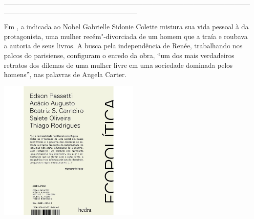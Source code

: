 \hspace*{-2cm}\_\_\_\_\_\_\_\_\_\_\_\_\_\_\_\_\_\_\_\_\_\_\_\_\_\_\_\_\_\_\_\_\_\_\_\_\_\_\_\_\_\_\_\_\_\_\_\_\_\_\_\_\_\_\_\_\_\_\_\_\_\_\_\_\_\_\_\_\_\_\_\_\_\_

\medskip

\noindent{}Em {}, a indicada ao Nobel Gabrielle Sidonie Colette mistura sua vida pessoal à da protagonista, uma mulher recém"-divorciada de um homem que a traía e roubava a autoria de seus livros. A busca pela independência de Renée, trabalhando nos palcos do {} parisiense, configuram o enredo da obra, “um dos mais verdadeiros retratos dos dilemas de uma mulher livre em uma sociedade dominada pelos homens”, nas palavras de Angela Carter.

\hspace{.5cm}

\hspace*{-.4cm}\begin{minipage}[c]{0.90\linewidth}
\small{
{}}
\end{minipage}

\pagebreak

\hspace{.5cm}

\begin{center}
\hspace*{-.5cm}\includegraphics[width=70mm]{eco.jpeg}
\end{center}


